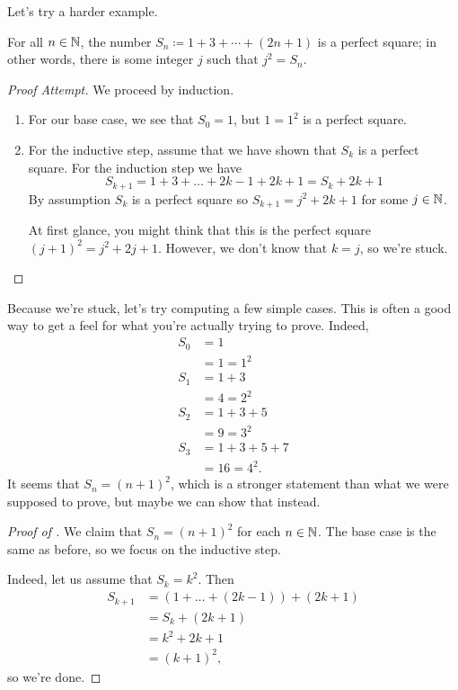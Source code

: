 \documentclass[../notes.tex]{subfiles}
\begin{document}
Let's try a harder example.
\begin{example} \label{exe:perfect-square}
    For all $n\in\mathbb N$, the number $S_n\coloneqq1+3+\cdots+(2n+1)$ is a perfect square; in other words, there is some integer $j$ such that $j^2 = S_n$.
\end{example}
\begin{proof}[Proof Attempt]
    We proceed by induction.
    \begin{enumerate}
        \item For our base case, we see that $S_0=1$, but $1=1^2$ is a perfect square.
        \item For the inductive step, assume that we have shown that $S_k$ is a perfect square. For the induction step we have 
        \[S_{k+1}=1+3+\ldots+2k-1+2k+1=S_k+2k+1 \]
        By assumption $S_k$ is a perfect square so $S_{k+1}=j^2+2k+1$ for some $j\in \mathbb N$.
        
        At first glance, you might think that this is the perfect square $(j+1)^2 = j^2 + 2j + 1$. However, we don't know that $k = j$, so we're stuck.
        \qedhere
    \end{enumerate}
\end{proof}
Because we're stuck, let's try computing a few simple cases. This is often a good way to get a feel for what you're actually trying to prove. Indeed,
\begin{align*}
    S_0 &= 1 \\
        &= 1 = 1^2 \\
    S_1 &= 1 + 3 \\
        &= 4 = 2^2 \\
    S_2 &= 1 + 3 + 5 \\
        &= 9 = 3^2 \\
    S_3 &= 1 + 3 + 5 + 7 \\
        &= 16 = 4^2.
\end{align*}
It seems that $S_n = (n+1)^2$, which is a stronger statement than what we were supposed to prove, but maybe we can show that instead.
\begin{proof}[Proof of ]
    We claim that $S_n=(n+1)^2$ for each $n\in\mathbb N$. The base case is the same as before, so we focus on the inductive step.
    
    Indeed, let us assume that $S_k = k^2$. Then
    \begin{align*}
        S_{k+1} &= (1 + \dots + (2k - 1)) + (2k + 1) \\
            &= S_k + (2k + 1) \\
            &= k^2 + 2k + 1 \\
            &= (k+1)^2,
    \end{align*} 
    so we're done.
\end{proof}
\end{document}
